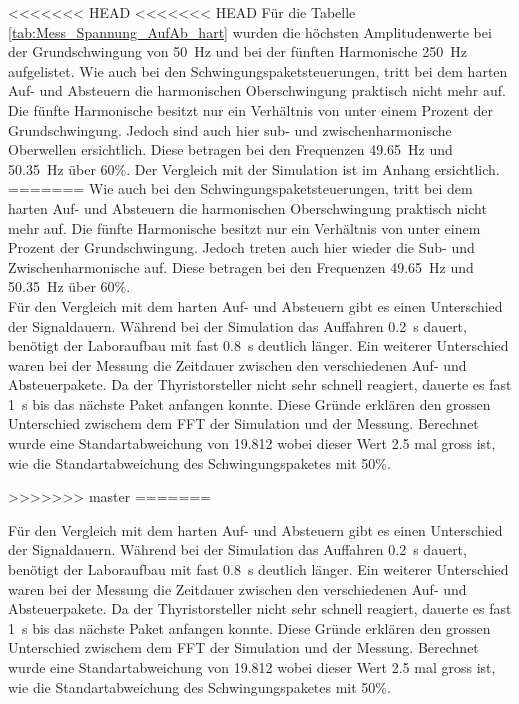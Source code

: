 <<<<<<< HEAD
<<<<<<< HEAD
Für die Tabelle \ref{tab:Mess_Spannung_AufAb_hart} wurden die höchsten Amplitudenwerte bei der Grundschwingung von \SI{50}{Hz} und bei der fünften Harmonische \SI{250}{Hz} aufgelistet.
Wie auch bei den Schwingungspaketsteuerungen, tritt bei dem harten Auf- und Absteuern die harmonischen Oberschwingung praktisch nicht mehr auf. Die fünfte Harmonische besitzt nur ein Verhältnis von unter einem Prozent der Grundschwingung. Jedoch sind auch hier sub- und zwischenharmonische Oberwellen ersichtlich. Diese betragen bei den Frequenzen \SI{49.65}{Hz} und \SI{50.35}{Hz} über 60\%. Der Vergleich mit der Simulation ist im Anhang ersichtlich.
=======
Wie auch bei den Schwingungspaketsteuerungen, tritt bei dem harten Auf- und Absteuern die harmonischen Oberschwingung praktisch nicht mehr auf. Die fünfte Harmonische besitzt nur ein Verhältnis von unter einem Prozent der Grundschwingung. Jedoch treten auch hier wieder die Sub- und Zwischenharmonische auf. Diese betragen bei den Frequenzen \SI{49.65}{Hz} und \SI{50.35}{Hz} über 60\%. \\
Für den Vergleich mit dem harten Auf- und Absteuern gibt es einen Unterschied der Signaldauern. Während bei der Simulation das Auffahren \SI{0.2}{s} dauert, benötigt der Laboraufbau mit fast \SI{0.8}{s} deutlich länger. Ein weiterer Unterschied waren bei der Messung die Zeitdauer zwischen den verschiedenen Auf- und Absteuerpakete. Da der Thyristorsteller nicht sehr schnell reagiert, dauerte es fast \SI{1}{s} bis das nächste Paket anfangen konnte. Diese Gründe erklären den grossen Unterschied zwischem dem FFT der Simulation und der Messung. Berechnet wurde eine Standartabweichung von 19.812 wobei dieser Wert 2.5 mal gross ist, wie die Standartabweichung des Schwingungspaketes mit 50\%.


>>>>>>> master
=======


Für den Vergleich mit dem harten Auf- und Absteuern gibt es einen Unterschied der Signaldauern. Während bei der Simulation das Auffahren \SI{0.2}{s} dauert, benötigt der Laboraufbau mit fast \SI{0.8}{s} deutlich länger. Ein weiterer Unterschied waren bei der Messung die Zeitdauer zwischen den verschiedenen Auf- und Absteuerpakete. Da der Thyristorsteller nicht sehr schnell reagiert, dauerte es fast \SI{1}{s} bis das nächste Paket anfangen konnte. Diese Gründe erklären den grossen Unterschied zwischem dem FFT der Simulation und der Messung. Berechnet wurde eine Standartabweichung von 19.812 wobei dieser Wert 2.5 mal gross ist, wie die Standartabweichung des Schwingungspaketes mit 50\%.

